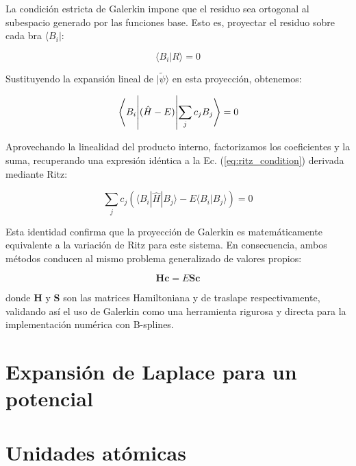 \documentclass[12pt, a4paper, oneside, spanish]{book}
\begin{document}
La condición estricta de Galerkin impone que el residuo sea ortogonal al subespacio generado por las funciones base. Esto es, proyectar el residuo sobre cada bra \( \langle B_i| \):

\begin{equation}
    \langle B_i | R \rangle = 0
\end{equation}

Sustituyendo la expansión lineal de $|\tilde{\psi}\rangle$ en esta proyección, obtenemos:

\begin{equation}
  \mel{B_i}{(\hat{H} - E)}{\sum_jc_jB_j} = 0
\end{equation}

Aprovechando la linealidad del producto interno, factorizamos los coeficientes y la suma, recuperando una expresión idéntica a la Ec. (\cref{eq:ritz_condition}) derivada mediante Ritz:

\begin{equation}
    \sum_{j} c_j \left( \langle B_i | \hat{H} | B_j \rangle - E \langle B_i | B_j \rangle \right) = 0
\end{equation}

Esta identidad confirma que la proyección de Galerkin es matemáticamente equivalente a la variación de Ritz para este sistema. En consecuencia, ambos métodos conducen al mismo problema generalizado de valores propios:

\begin{equation}
    \mathbf{H}\mathbf{c} = E \mathbf{S}\mathbf{c}
\end{equation}

donde $\mathbf{H}$ y $\mathbf{S}$ son las matrices Hamiltoniana y de traslape respectivamente, validando así el uso de Galerkin como una herramienta rigurosa y directa para la implementación numérica con B-splines.


\printbibliography[heading=bibintoc, title={Referencias Bibliográficas}]

\appendix

\chapter{Expansión de Laplace para un potencial}

\chapter{Unidades atómicas}
\end{document}
